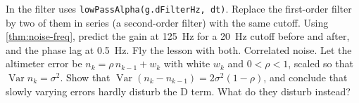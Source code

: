 \begin{exercises}
\exercise[2] In  the filter uses \texttt{lowPassAlpha(g.dFilterHz, dt)}. Replace the first-order filter by two of them in series (a second-order filter) with the same cutoff. Using \cref{thm:noise-freq}, predict the gain at \SI{125}{Hz} for a \SI{20}{Hz} cutoff before and after, and the phase lag at \SI{0.5}{Hz}. Fly the lesson with both.
\exercise[3] Correlated noise. Let the altimeter error be $n_k = \rho\,n_{k-1} + w_k$ with white $w_k$ and $0 < \rho < 1$, scaled so that $\operatorname{Var} n_k = \sigma^2$. Show that $\operatorname{Var}(n_k - n_{k-1}) = 2\sigma^2(1 - \rho)$, and conclude that slowly varying errors hardly disturb the D term. What do they disturb instead?
\end{exercises}
